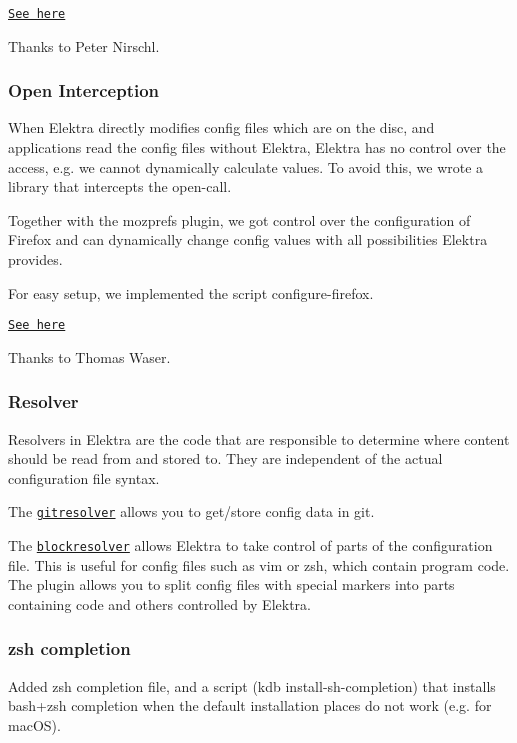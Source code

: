 \href{https://master.libelektra.org/src/plugins/crypto}{\tt See here}

Thanks to Peter Nirschl.

\subsubsection*{Open Interception}

When Elektra directly modifies config files which are on the disc, and applications read the config files without Elektra, Elektra has no control over the access, e.\+g. we cannot dynamically calculate values. To avoid this, we wrote a library that intercepts the {\ttfamily open}-\/call.

Together with the {\ttfamily mozprefs} plugin, we got control over the configuration of Firefox and can dynamically change config values with all possibilities Elektra provides.

For easy setup, we implemented the script {\ttfamily configure-\/firefox}.

\href{https://master.libelektra.org/src/bindings/intercept}{\tt See here}

Thanks to Thomas Waser.

\subsubsection*{Resolver}

Resolvers in Elektra are the code that are responsible to determine where content should be read from and stored to. They are independent of the actual configuration file syntax.

The \href{https://master.libelektra.org/src/plugins/gitresolver}{\tt gitresolver} allows you to get/store config data in git.

The \href{https://master.libelektra.org/src/plugins/blockresolver}{\tt blockresolver} allows Elektra to take control of parts of the configuration file. This is useful for config files such as vim or zsh, which contain program code. The plugin allows you to split config files with special markers into parts containing code and others controlled by Elektra.

\subsubsection*{zsh completion}

Added zsh completion file, and a script ({\ttfamily kdb install-\/sh-\/completion}) that installs bash+zsh completion when the default installation places do not work (e.\+g. for mac\+OS).

